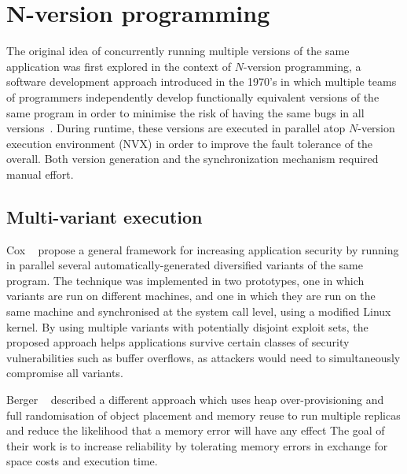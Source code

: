 \section{N-version programming}

The original idea of concurrently running multiple versions of the same
application was first explored in the context of $N$-version programming, a
software development approach introduced in the 1970's in which multiple teams
of programmers independently develop functionally equivalent versions of the
same program in order to minimise the risk of having the same bugs in all
versions~\cite{chen1995}. During runtime, these versions are executed in
parallel atop $N$-version execution environment (NVX)  in order to improve the
fault tolerance of the overall. Both version generation and the synchronization
mechanism required manual effort.



\subsection{Multi-variant execution}

Cox \etal~\cite{cox2006} propose a general framework for increasing application
security by running in parallel several automatically-generated diversified
variants of the same program.  The technique was implemented in two prototypes,
one in which variants are run on different machines, and one in which they are
run on the same machine and synchronised at the system call level, using a
modified Linux kernel.  By using multiple variants with potentially disjoint
exploit sets, the proposed approach helps applications survive certain classes
of security vulnerabilities such as buffer overflows, as attackers would need
to simultaneously compromise all variants.

Berger \etal~\cite{diehard06} described a different approach which uses heap
over-provisioning and full randomisation of object placement and memory reuse
to run multiple replicas and reduce the likelihood that a memory error will
have any effect
The goal of their work is to increase reliability by tolerating memory errors
in exchange for space costs and execution time.

